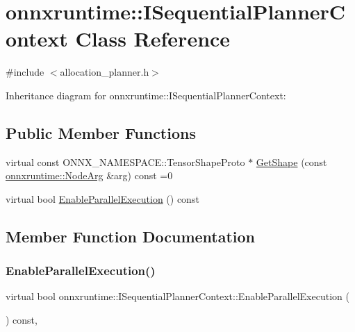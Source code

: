 \hypertarget{classonnxruntime_1_1ISequentialPlannerContext}{}\section{onnxruntime\+:\+:I\+Sequential\+Planner\+Context Class Reference}
\label{classonnxruntime_1_1ISequentialPlannerContext}


{\ttfamily \#include $<$allocation\+\_\+planner.\+h$>$}



Inheritance diagram for onnxruntime\+:\+:I\+Sequential\+Planner\+Context\+:
\subsection*{Public Member Functions}
\begin{DoxyCompactItemize}
\item 
virtual const O\+N\+N\+X\+\_\+\+N\+A\+M\+E\+S\+P\+A\+C\+E\+::\+Tensor\+Shape\+Proto $\ast$ \mbox{\hyperlink{classonnxruntime_1_1ISequentialPlannerContext_a7665a01ff1cf7e45b2b84ef9ab2ae741}{Get\+Shape}} (const \mbox{\hyperlink{classonnxruntime_1_1NodeArg}{onnxruntime\+::\+Node\+Arg}} \&arg) const =0
\item 
virtual bool \mbox{\hyperlink{classonnxruntime_1_1ISequentialPlannerContext_af3f57802287c32c4a0d9b7dd4da88c4a}{Enable\+Parallel\+Execution}} () const
\end{DoxyCompactItemize}


\subsection{Member Function Documentation}
\mbox{\label{classonnxruntime_1_1ISequentialPlannerContext_af3f57802287c32c4a0d9b7dd4da88c4a}} 
\subsubsection{\texorpdfstring{Enable\+Parallel\+Execution()}{EnableParallelExecution()}}
{\footnotesize\ttfamily virtual bool onnxruntime\+::\+I\+Sequential\+Planner\+Context\+::\+Enable\+Parallel\+Execution (\begin{DoxyParamCaption}{ }\end{DoxyParamCaption}) const\hspace{0.3cm}{\ttfamily [inline]}, {\ttfamily [virtual]}}



